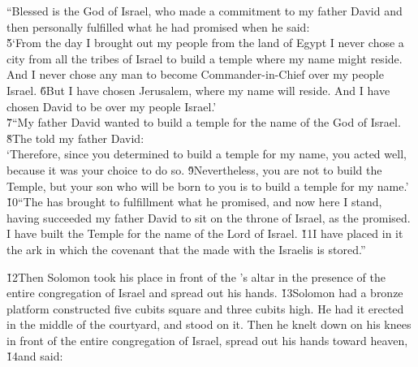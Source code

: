 \begin{poetry}
\poeml ``Blessed is the  God of Israel, who made a commitment to my father David and then personally fulfilled what he had promised when he said: \\
\poeml \v{5}`From the day I brought out my people from the land of Egypt I never chose a city from all the tribes of Israel to build a temple where my name might reside. And I never chose any man to become Commander-in-Chief over my people Israel. \v{6}But I have chosen Jerusalem, where my name will reside. And I have chosen David to be over my people Israel.' \\
\poeml \v{7}``My father David wanted to build a temple for the name of the  God of Israel. \v{8}The  told my father David: \\
\poeml `Therefore, since you determined to build a temple for my name, you acted well, because it was your choice to do so. \v{9}Nevertheless, you are not to build the Temple, but your son who will be born to you is to build a temple for my name.' \\
\poeml \v{10}``The  has brought to fulfillment what he promised, and now here I stand, having succeeded my father David to sit on the throne of Israel, as the  promised. I have built the Temple for the name of the Lord  of Israel. \v{11}I have placed in it the ark in which the covenant that the  made with the Israelis is stored.''
\end{poetry}

\v{12}Then Solomon took his place in front of the 's altar in the presence of the entire congregation of Israel and spread out his hands. \v{13}Solomon had a bronze platform constructed five cubits square and three cubits high. He had it erected in the middle of the courtyard, and stood on it. Then he knelt down on his knees in front of the entire congregation of Israel, spread out his hands toward heaven, \v{14}and said:

